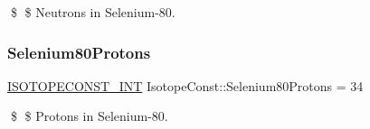 \$ \$ Neutrons in Selenium-\/80. \mbox{\label{group___isotope_const-_selenium-_se80_gaccabc34bc33e2dcf1f225a75de81be74}} 
\subsubsection{\texorpdfstring{Selenium80\+Protons}{Selenium80Protons}}
{\footnotesize\ttfamily \mbox{\hyperlink{group___isotope_const-_macros_ga5f18360b3e99483a35c32d789e62621c}{I\+S\+O\+T\+O\+P\+E\+C\+O\+N\+S\+T\+\_\+\+I\+NT}} Isotope\+Const\+::\+Selenium80\+Protons = 34}

\$ \$ Protons in Selenium-\/80. 